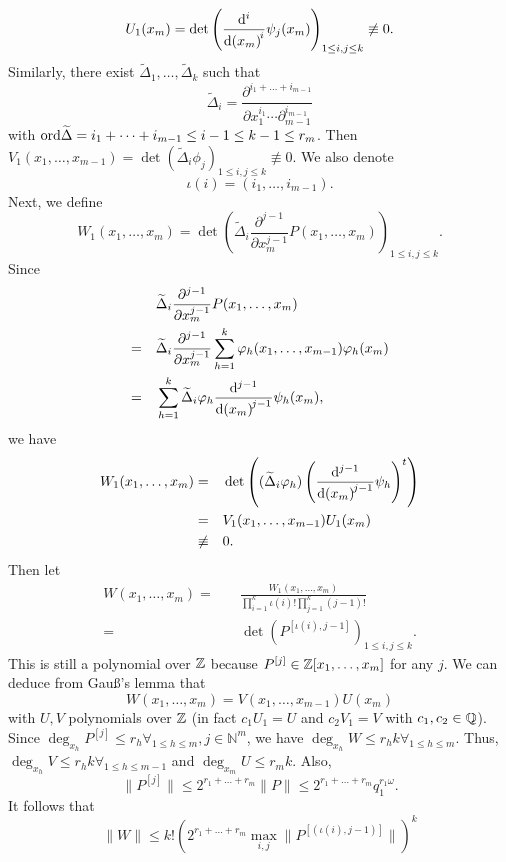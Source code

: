 \documentclass{Vorlesungstemplate_English} %
\newcommand{\Nzero}{\mathbb{N}}
\begin{document}
\begin{pf}
  \[ U_1(x_m) = \det\left(\diff[i]{}{x_m}\psi_j(x_m)\right)_{1 \leq i,j \leq k} \not\equiv 0.\]
  Similarly, there exist $\widetilde{\Delta}_1, \dots, \widetilde{\Delta}_k$ such that
  \[ \widetilde{\Delta}_i = \frac{\partial^{i_1+\dots+i_{m-1}}}{\partial x_1^{i_1}\cdots\partial_{m-1}^{i_{m-1}}}\]
  with $\text{ord}\widetilde{\Delta} = i_1+\dots+i_{m-1} \leq i-1 \leq k-1 \leq r_m$. Then $V_1(x_1, \dots, x_{m-1}) = \det(\widetilde{\Delta}_i\phi_j)_{1 \leq i,j \leq k} \not\equiv 0$. We also denote
  \[ \iota(i) = (i_1, \dots, i_{m-1}).\]
  Next, we define
  \[ W_1(x_1, \dots, x_m) = \det\left(\widetilde{\Delta}_i\frac{\partial^{j-1}}{\partial x_m^{j-1}}P(x_1, \dots, x_m)\right)_{1 \leq i,j \leq k}.\]
  Since
  \begin{align*} & \widetilde{\Delta}_i\frac{\partial^{j-1}}{\partial x_m^{j-1}}P(x_1, \dots, x_m) \\
  = \quad & \widetilde{\Delta}_i\frac{\partial^{j-1}}{\partial x_m^{j-1}}\sum_{h=1}^k\phi_h(x_1, \dots, x_{m-1})\phi_h(x_m) \\
  = \quad & \sum_{h=1}^k \widetilde{\Delta}_i\phi_h\diff[j-1]{}{x_m}\psi_h(x_m),\end{align*}
  we have
  \begin{align*}
    W_1(x_1, \dots, x_m) = \quad & \det\left((\widetilde{\Delta}_i\phi_h)\left(\diff[j-1]{}{x_m}\psi_h\right)^t\right) \\
    = \quad & V_1(x_1, \dots, x_{m-1})U_1(x_m) \\
    \not\equiv \quad & 0.
  \end{align*}
  Then let
  \begin{align*}
    W(x_1, \dots, x_m) = \quad & \frac{W_1(x_1, \dots, x_m)}{\prod_{i=1}^k \iota(i)!\prod_{j=1}^k (j-1)!} \\
    = \quad & \det(P^{[\iota(i), j-1]})_{1 \leq i,j \leq k}.
  \end{align*}
  This is still a polynomial over $\mathbb{Z}$ because $P^{[j]} \in \mathbb{Z}[x_1, \dots, x_m]$ for any $j$. We can deduce from Gauß's lemma that
  \[ W(x_1, \dots, x_m) = V(x_1, \dots, x_{m-1})U(x_m)\]
  with $U,V$ polynomials over $\mathbb{Z}$ (in fact $c_1U_1 = U$ and $c_2V_1 = V$ with $c_1,c_2 \in \mathbb{Q}$). Since $\deg_{x_h}P^{[j]} \leq r_h \forall_{1 \leq h \leq m}, j \in \Nzero^m$, we have $\deg_{x_h}W \leq r_hk \forall_{1 \leq h \leq m}$. Thus, $\deg_{x_h}V \leq r_hk \forall_{1 \leq h \leq m-1}$ and $\deg_{x_m}U \leq r_mk$. Also,
  \[ \| P^{[j]}\| \leq 2^{r_1+\dots+r_m}\|P\| \leq 2^{r_1+\dots+r_m}q_1^{r_1\omega}.\]
  It follows that
  \[ \|W\| \leq k!\left(2^{r_1+\dots+r_m}\max_{i,j}\|P^{[(\iota(i),j-1)]}\|\right)^k\]

\end{pf}
\end{document}
